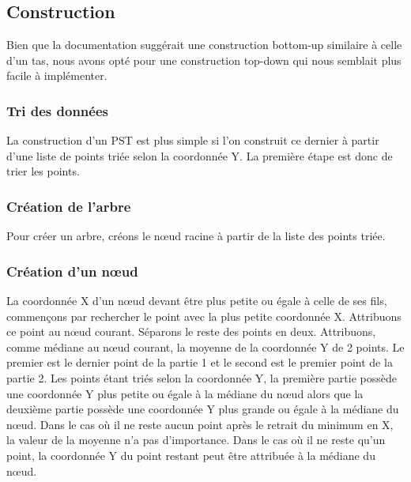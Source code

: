 \documentclass[10pt,a4paper]{article}
\begin{document}
\subsection{Construction}
Bien que la documentation suggérait une construction bottom-up similaire à celle d'un tas, nous avons opté pour une construction top-down qui nous semblait plus facile à implémenter.

\subsubsection{Tri des données}
La construction d'un PST est plus simple si l'on construit ce dernier à partir d'une liste de points triée selon la coordonnée Y. La première étape est donc de trier les points.

\subsubsection{Création de l'arbre}
Pour créer un arbre, créons le nœud racine à partir de la liste des points triée.

\subsubsection{Création d'un nœud}
La coordonnée X d'un nœud devant être plus petite ou égale à celle de ses fils, commençons par rechercher le point avec la plus petite coordonnée X. Attribuons ce point au nœud courant. Séparons le reste des points en deux. Attribuons, comme médiane au nœud courant, la moyenne de la coordonnée Y de 2 points. Le premier est le dernier point de la partie 1 et le second est le premier point de la partie 2. Les points étant triés selon la coordonnée Y, la première partie possède une coordonnée Y plus petite ou égale à la médiane du nœud alors que la deuxième partie possède une coordonnée Y plus grande ou égale à la médiane du nœud. Dans le cas où il ne reste aucun point après le retrait du minimum en X, la valeur de la moyenne n'a pas d'importance. Dans le cas où il ne reste qu'un point, la coordonnée Y du point restant peut être attribuée à la médiane du nœud.

\end{document}
